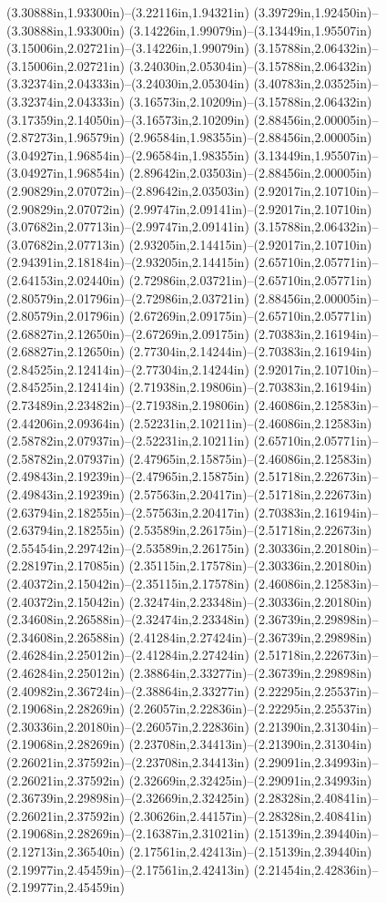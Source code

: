 (3.30888in,1.93300in)--(3.22116in,1.94321in) (3.39729in,1.92450in)--(3.30888in,1.93300in) (3.14226in,1.99079in)--(3.13449in,1.95507in) (3.15006in,2.02721in)--(3.14226in,1.99079in) (3.15788in,2.06432in)--(3.15006in,2.02721in) (3.24030in,2.05304in)--(3.15788in,2.06432in) (3.32374in,2.04333in)--(3.24030in,2.05304in) (3.40783in,2.03525in)--(3.32374in,2.04333in) (3.16573in,2.10209in)--(3.15788in,2.06432in) (3.17359in,2.14050in)--(3.16573in,2.10209in) (2.88456in,2.00005in)--(2.87273in,1.96579in) (2.96584in,1.98355in)--(2.88456in,2.00005in) (3.04927in,1.96854in)--(2.96584in,1.98355in) (3.13449in,1.95507in)--(3.04927in,1.96854in) (2.89642in,2.03503in)--(2.88456in,2.00005in) (2.90829in,2.07072in)--(2.89642in,2.03503in) (2.92017in,2.10710in)--(2.90829in,2.07072in) (2.99747in,2.09141in)--(2.92017in,2.10710in) (3.07682in,2.07713in)--(2.99747in,2.09141in) (3.15788in,2.06432in)--(3.07682in,2.07713in) (2.93205in,2.14415in)--(2.92017in,2.10710in) (2.94391in,2.18184in)--(2.93205in,2.14415in) (2.65710in,2.05771in)--(2.64153in,2.02440in) (2.72986in,2.03721in)--(2.65710in,2.05771in) (2.80579in,2.01796in)--(2.72986in,2.03721in) (2.88456in,2.00005in)--(2.80579in,2.01796in) (2.67269in,2.09175in)--(2.65710in,2.05771in) (2.68827in,2.12650in)--(2.67269in,2.09175in) (2.70383in,2.16194in)--(2.68827in,2.12650in) (2.77304in,2.14244in)--(2.70383in,2.16194in) (2.84525in,2.12414in)--(2.77304in,2.14244in) (2.92017in,2.10710in)--(2.84525in,2.12414in) (2.71938in,2.19806in)--(2.70383in,2.16194in) (2.73489in,2.23482in)--(2.71938in,2.19806in) (2.46086in,2.12583in)--(2.44206in,2.09364in) (2.52231in,2.10211in)--(2.46086in,2.12583in) (2.58782in,2.07937in)--(2.52231in,2.10211in) (2.65710in,2.05771in)--(2.58782in,2.07937in) (2.47965in,2.15875in)--(2.46086in,2.12583in) (2.49843in,2.19239in)--(2.47965in,2.15875in) (2.51718in,2.22673in)--(2.49843in,2.19239in) (2.57563in,2.20417in)--(2.51718in,2.22673in) (2.63794in,2.18255in)--(2.57563in,2.20417in) (2.70383in,2.16194in)--(2.63794in,2.18255in) (2.53589in,2.26175in)--(2.51718in,2.22673in) (2.55454in,2.29742in)--(2.53589in,2.26175in) (2.30336in,2.20180in)--(2.28197in,2.17085in) (2.35115in,2.17578in)--(2.30336in,2.20180in) (2.40372in,2.15042in)--(2.35115in,2.17578in) (2.46086in,2.12583in)--(2.40372in,2.15042in) (2.32474in,2.23348in)--(2.30336in,2.20180in) (2.34608in,2.26588in)--(2.32474in,2.23348in) (2.36739in,2.29898in)--(2.34608in,2.26588in) (2.41284in,2.27424in)--(2.36739in,2.29898in) (2.46284in,2.25012in)--(2.41284in,2.27424in) (2.51718in,2.22673in)--(2.46284in,2.25012in) (2.38864in,2.33277in)--(2.36739in,2.29898in) (2.40982in,2.36724in)--(2.38864in,2.33277in) (2.22295in,2.25537in)--(2.19068in,2.28269in) (2.26057in,2.22836in)--(2.22295in,2.25537in) (2.30336in,2.20180in)--(2.26057in,2.22836in) (2.21390in,2.31304in)--(2.19068in,2.28269in) (2.23708in,2.34413in)--(2.21390in,2.31304in) (2.26021in,2.37592in)--(2.23708in,2.34413in) (2.29091in,2.34993in)--(2.26021in,2.37592in) (2.32669in,2.32425in)--(2.29091in,2.34993in) (2.36739in,2.29898in)--(2.32669in,2.32425in) (2.28328in,2.40841in)--(2.26021in,2.37592in) (2.30626in,2.44157in)--(2.28328in,2.40841in) (2.19068in,2.28269in)--(2.16387in,2.31021in) (2.15139in,2.39440in)--(2.12713in,2.36540in) (2.17561in,2.42413in)--(2.15139in,2.39440in) (2.19977in,2.45459in)--(2.17561in,2.42413in) (2.21454in,2.42836in)--(2.19977in,2.45459in) 